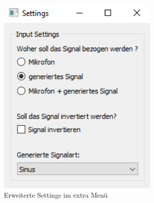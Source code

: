 \documentclass{article}
\begin{document}
\begin{figure}[H]
  \includegraphics[width=300]{"SettingsWindow"}
  \caption[\textbf{SettingsWindow.PNG},  Quelle:  Quelle: Screenshot eigenes Programm]
  {Erweiterte Settings im extra Menü}
\end{figure}
\end{document}
